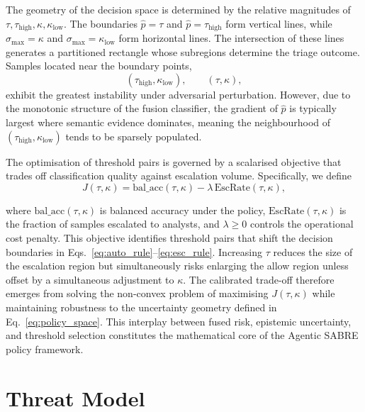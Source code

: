 \documentclass[lettersize,journal]{IEEEtran}
\begin{document}
The geometry of the decision space is determined by the relative magnitudes of \(\tau,\tau_{\mathrm{high}},\kappa,\kappa_{\mathrm{low}}\). The boundaries \(\hat{p}=\tau\) and \(\hat{p}=\tau_{\mathrm{high}}\) form vertical lines, while \(\sigma_{\max}=\kappa\) and \(\sigma_{\max}=\kappa_{\mathrm{low}}\) form horizontal lines. The intersection of these lines generates a partitioned rectangle whose subregions determine the triage outcome. Samples located near the boundary points,
\begin{equation}
(\tau_{\mathrm{high}}, \kappa_{\mathrm{low}}), \qquad (\tau, \kappa),
\label{eq:corners}
\end{equation}
exhibit the greatest instability under adversarial perturbation. However, due to the monotonic structure of the fusion classifier, the gradient of \(\hat{p}\) is typically largest where semantic evidence dominates, meaning the neighbourhood of \((\tau_{\mathrm{high}},\kappa_{\mathrm{low}})\) tends to be sparsely populated.


\cbstart
The optimisation of threshold pairs is governed by a scalarised objective that trades off
classification quality against escalation volume. Specifically, we define
\begin{equation}
J(\tau,\kappa) = \mathrm{bal\_acc}(\tau,\kappa) - \lambda\,\mathrm{EscRate}(\tau,\kappa),
\label{eq:objective}
\end{equation}
\cbend

where $\mathrm{bal\_acc}(\tau,\kappa)$ is balanced accuracy under the policy,
$\mathrm{EscRate}(\tau,\kappa)$ is the fraction of samples escalated to analysts, and
$\lambda \ge 0$ controls the operational cost penalty.
This objective identifies threshold pairs that shift the decision boundaries in
Eqs.~\eqref{eq:auto_rule}--\eqref{eq:esc_rule}. Increasing \(\tau\) reduces the size of the
escalation region but simultaneously risks enlarging the allow region unless offset by a
simultaneous adjustment to \(\kappa\). The calibrated trade-off therefore emerges from solving
the non-convex problem of maximising \(J(\tau,\kappa)\) while maintaining robustness to the
uncertainty geometry defined in Eq.~\eqref{eq:policy_space}. 
\cbstart
This interplay between fused risk,
epistemic uncertainty, and threshold selection constitutes the mathematical core of the Agentic
SABRE policy framework.
\cbend



\section{Threat Model}
\label{sec:threatmodel}
\end{document}
